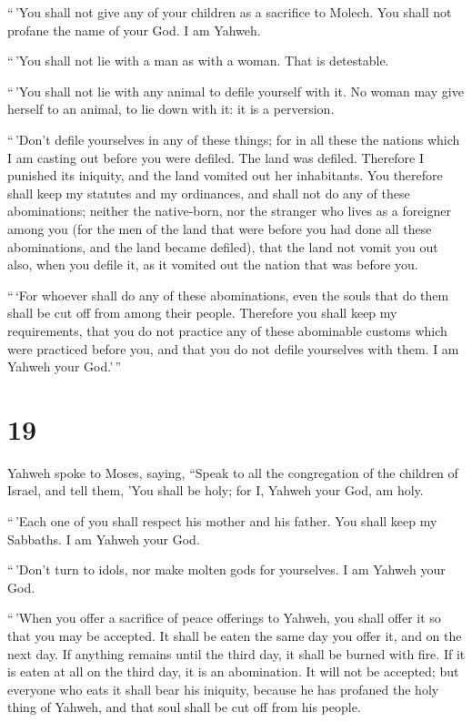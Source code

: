  ``\,'You shall not give any of your children as a
sacrifice to Molech. You shall not profane the name of your God. I am
Yahweh.

 ``\,'You shall not lie with a man as with a woman. That
is detestable.

 ``\,'You shall not lie with any animal to defile
yourself with it. No woman may give herself to an animal, to lie down
with it: it is a perversion.

 ``\,'Don't defile yourselves in any of these things; for
in all these the nations which I am casting out before you were defiled.
 The land was defiled. Therefore I punished its iniquity,
and the land vomited out her inhabitants.  You therefore
shall keep my statutes and my ordinances, and shall not do any of these
abominations; neither the native-born, nor the stranger who lives as a
foreigner among you  (for the men of the land that were
before you had done all these abominations, and the land became
defiled),  that the land not vomit you out also, when you
defile it, as it vomited out the nation that was before you.

 ``\,`For whoever shall do any of these abominations,
even the souls that do them shall be cut off from among their people.
 Therefore you shall keep my requirements, that you do
not practice any of these abominable customs which were practiced before
you, and that you do not defile yourselves with them. I am Yahweh your
God.'\,''

\hypertarget{section-18}{%
\section{19}\label{section-18}}

 Yahweh spoke to Moses, saying,  ``Speak to
all the congregation of the children of Israel, and tell them, 'You
shall be holy; for I, Yahweh your God, am holy.

 ``\,'Each one of you shall respect his mother and his
father. You shall keep my Sabbaths. I am Yahweh your God.

 ``\,'Don't turn to idols, nor make molten gods for
yourselves. I am Yahweh your God.

 ``\,'When you offer a sacrifice of peace offerings to
Yahweh, you shall offer it so that you may be accepted. 
It shall be eaten the same day you offer it, and on the next day. If
anything remains until the third day, it shall be burned with fire.
 If it is eaten at all on the third day, it is an
abomination. It will not be accepted;  but everyone who
eats it shall bear his iniquity, because he has profaned the holy thing
of Yahweh, and that soul shall be cut off from his people.

